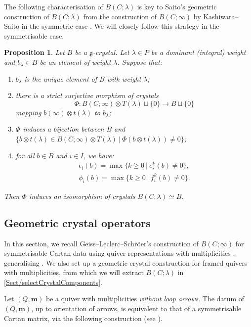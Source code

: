 \documentclass[a4paper,12pt]{article}
\theoremstyle{definition}
\theoremstyle{plain}
\newtheorem{proposition}[definition]{Proposition}
\theoremstyle{remark}
\newcommand\bfm{\mathbf{m}}
\begin{document}
The following characterisation of $B(C;\lambda)$ is key to Saito's geometric construction of $B(C;\lambda)$ from the construction of $B(C;\infty)$ by Kashiwara--Saito in the symmetric case \cite{KS97,Sai02}. We will closely follow this strategy in the symmetrisable case. 

\begin{proposition}\label{Prop/SaitoCriterion}
\emph{\cite[Prop.\ 2.3.1]{Sai02}}
Let $B$ be a $\mathfrak{g}$-crystal. Let $\lambda\in P$ be a dominant (integral) weight and $b_\lambda\in B$ be an element of weight $\lambda$. Suppose that:
\begin{enumerate}[label=\roman*)]
\item $b_\lambda$ is the unique element of $B$ with weight $\lambda$;
\item there is a strict surjective morphism of crystals
\[
\Phi\colon B(C;\infty)\otimes T(\lambda)\sqcup\{0\}\rightarrow B\sqcup\{0\}
\]
mapping $b(\infty)\otimes t(\lambda)$ to $b_\lambda$;
\item $\Phi$ induces a bijection between $B$ and $\{ b\otimes t(\lambda)\in B(C;\infty)\otimes T(\lambda)\ \vert\ \Phi(b\otimes t(\lambda))\ne0\}$;
\item for all $b\in B$ and $i\in I$, we have:
\begin{align*}
\epsilon_i(b)=\max\{k\geq0\ \vert\ e_i^k(b)\ne0\} , \\
\phi_i(b)=\max\{k\geq0\ \vert\ f_i^k(b)\ne0\} .
\end{align*}
\end{enumerate}
Then $\Phi$ induces an isomorphism of crystals $B(C;\lambda) \simeq B$.
\end{proposition}

\subsection{Geometric crystal operators}\label{Sect/GLScrystals}

In this section, we recall Geiss--Leclerc--Schr\"{o}er's construction of $B(C;\infty)$ for symmetrisable Cartan data using quiver representations with multiplicities \cite{GLS18a}, generalising \cite{KS97}. We also set up a geometric crystal construction for framed quivers with multiplicities, from which we will extract $B(C;\lambda)$ in \cref{Sect/selectCrystalComponents}.

Let $(Q,\bfm)$ be a quiver with multiplicities \emph{without loop arrows}. The datum of $(Q,\bfm)$, up to orientation of arrows, is equivalent to that of a symmetrisable Cartan matrix, via the following construction (see \cite{GLS17a}).
\end{document}
